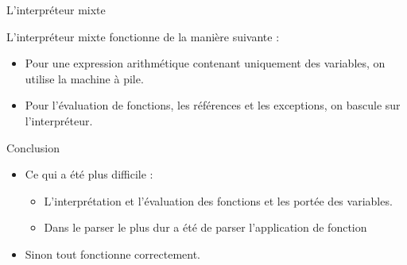 \documentclass[12pt]{beamer}
\begin{document}
\begin{frame}{L'interpréteur mixte}

L'interpréteur mixte fonctionne de la manière suivante :


\vspace{12pt}  

\begin{itemize}
  \item Pour une expression arithmétique contenant uniquement des variables, on utilise la machine à pile.
  
    \vspace{12pt}  
  
  \item Pour l'évaluation de fonctions, les références et les exceptions, on bascule sur l'interpréteur.
\end{itemize}

\end{frame}



\begin{frame}{Conclusion}
\begin{itemize}
\item Ce qui a été plus difficile :
\begin{itemize}
\item L'interprétation et  l'évaluation des fonctions et les portée des variables.
\item Dans le parser le plus dur a été de parser l'application de fonction
\end{itemize}

\item Sinon tout fonctionne correctement.
\end{itemize}
\end{frame}
\end{document}
